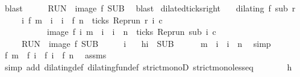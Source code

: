 \begin{isabellebody}
\ blast\isanewline
\ \ \isacommand{{\isacharbraceright}}\isamarkupfalse%
\ \isamarkupfalse%
\ {\isacartoucheopen}{\isacharquery}RUN\ {\isasymsubseteq}\ image\ f\ {\isacharquery}SUB{\isacartoucheclose}\ \isamarkupfalse%
\ blast\isanewline
{}\isamarkupfalse%
%
\endisatagproof
{\isafoldproof}%
%
\isadelimproof
\isanewline
%
\endisadelimproof
\isanewline
{}\isamarkupfalse%
\ dilated{\isacharunderscore}ticks{\isacharunderscore}right{\isacharcolon}\isanewline
\ \ \ {\isacartoucheopen}dilating\ f\ sub\ r{\isacartoucheclose}\isanewline
\ \ \ \ \ {\isacartoucheopen}{\isacharbraceleft}i{\isachardot}\ f\ m\ {\isacharless}\ i\ {\isasymand}\ i\ {\isasymle}\ f\ n\ {\isasymand}\ ticks\ {\isacharparenleft}{\isacharparenleft}Rep{\isacharunderscore}run\ r{\isacharparenright}\ i\ c{\isacharparenright}{\isacharbraceright}\isanewline
\ \ \ \ \ \ \ \ \ \ {\isacharequal}\ image\ f\ {\isacharbraceleft}i{\isachardot}\ m\ {\isacharless}\ i\ {\isasymand}\ i\ {\isasymle}\ n\ {\isasymand}\ ticks\ {\isacharparenleft}{\isacharparenleft}Rep{\isacharunderscore}run\ sub{\isacharparenright}\ i\ c{\isacharparenright}{\isacharbraceright}{\isacartoucheclose}\isanewline
\ \ \ \ {\isacharparenleft}\ {\isacartoucheopen}{\isacharquery}RUN\ {\isacharequal}\ image\ f\ {\isacharquery}SUB{\isacartoucheclose}{\isacharparenright}\isanewline
%
\isadelimproof
%
\endisadelimproof
%
\isatagproof
{}\isamarkupfalse%
\isanewline
\ \ \isacommand{{\isacharbraceleft}}\isamarkupfalse%
\ \isamarkupfalse%
\ i\ \ \isamarkupfalse%
\ h{\isacharcolon}{\isacartoucheopen}i\ {\isasymin}\ {\isacharquery}SUB{\isacartoucheclose}\isanewline
\ \ \ \ \isamarkupfalse%
\ {\isacartoucheopen}m\ {\isacharless}\ i\ {\isasymand}\ i\ {\isasymle}\ n{\isacartoucheclose}\ \isamarkupfalse%
\ simp\isanewline
\ \ \ \ \isamarkupfalse%
\ {\isacartoucheopen}f\ m\ {\isacharless}\ f\ i\ {\isasymand}\ f\ i\ {\isasymle}\ {\isacharparenleft}f\ n{\isacharparenright}{\isacartoucheclose}\ \isamarkupfalse%
\ assms\isanewline
\ \ \ \ \ \ \isamarkupfalse%
\ {\isacharparenleft}simp\ add{\isacharcolon}\ dilating{\isacharunderscore}def\ dilating{\isacharunderscore}fun{\isacharunderscore}def\ strict{\isacharunderscore}monoD\ strict{\isacharunderscore}mono{\isacharunderscore}less{\isacharunderscore}eq{\isacharparenright}\isanewline
\ \ \ \ \isamarkupfalse%
\ \isamarkupfalse%
\ h\ \isamarkupfalse%

\end{isabellebody}
